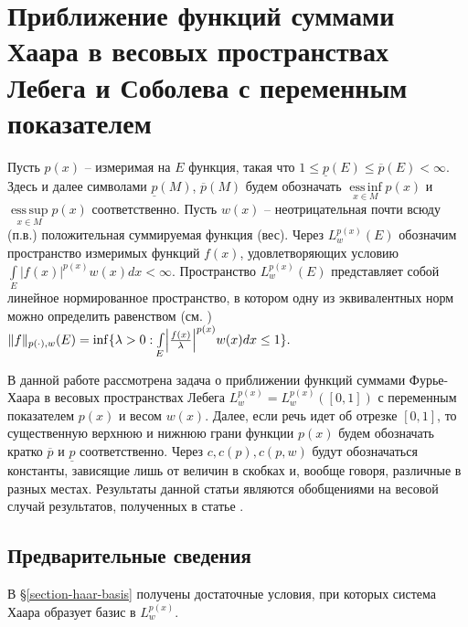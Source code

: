 \section{Приближение функций суммами Хаара в весовых пространствах Лебега и Соболева с переменным показателем}\label{section-haar-speed}
Пусть $p(x)$ -- измеримая на $E$ функция, такая что $1 \le \underline{p}(E) \le \overline{p}(E) < \infty$.
Здесь и далее символами $\underline{p}(M)$, $\overline{p}(M)$ будем обозначать $\operatorname*{ess\,inf}\limits_{x \in M}p(x)$ и $\operatorname*{ess\,sup}\limits_{x \in M}p(x)$ соответственно. Пусть $w(x)$ -- неотрицательная почти всюду (п.в.) положительная суммируемая функция (вес).
Через $L^{p(x)}_w(E)$ обозначим пространство измеримых функций $f(x)$, удовлетворяющих условию
$
  \int\limits_E |f(x)|^{p(x)}w(x)dx < \infty.
$
Пространство $L^{p(x)}_w(E)$ представляет собой линейное нормированное пространство, в котором одну из эквивалентных норм можно определить равенством (см. \cite{shii-lpx,shii-monog-2012,diening-book-2011,cruz-book-2013})
$
  \|f\|_{p(\cdot),w}(E) = \inf\{\lambda>0: \int\limits_E \Bigl|\frac{f(x)}{\lambda}\Bigr|^{p(x)}w(x)dx \le 1\}.
$

В данной работе рассмотрена задача о приближении функций суммами Фурье-Хаара в весовых пространствах Лебега $L^{p(x)}_w=L^{p(x)}_w([0,1])$ с переменным показателем $p(x)$ и весом $w(x)$. Далее, если речь идет об отрезке $[0,1]$, то существенную верхнюю и нижнюю грани функции $p(x)$ будем обозначать кратко $\overline{p}$ и $\underline{p}$ соответственно. Через $c, c(p), c(p,w)$ будут обозначаться константы, зависящие лишь от величин в скобках и, вообще говоря, различные в разных местах. Результаты данной статьи являются обобщениями на весовой случай результатов, полученных в статье \cite{shii-haarspeed}.

\subsection{Предварительные сведения}
В \S\ref{section-haar-basis} получены достаточные условия, при которых система Хаара образует базис в $L^{p(x)}_w$.

